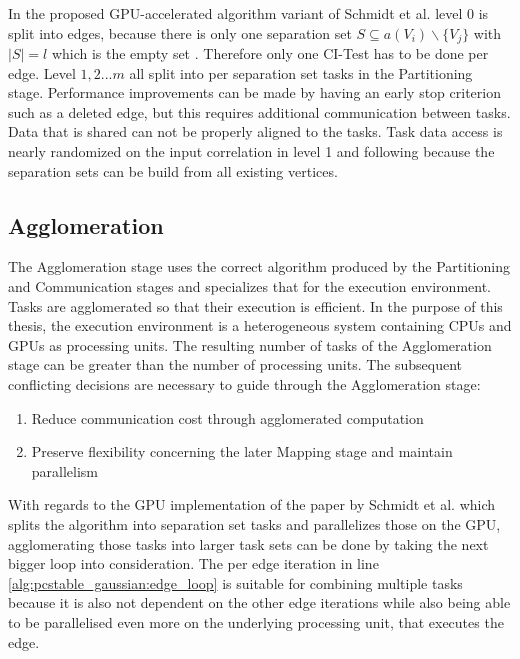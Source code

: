 In the proposed GPU-accelerated algorithm variant of Schmidt et al. \cite{schmidtOrderIndependentConstraintBasedCausal2018} level 0 is split into edges, because there is only one separation set $S \subseteq a(V_i ) \backslash \{V_j\}$ with $| S | = l$ which is the empty set ${}$. Therefore only one CI-Test has to be done per edge.
Level $1,2 ... m$ all split into per separation set tasks in the Partitioning stage. Performance improvements can be made by having an early stop criterion such as a deleted edge, but this requires additional communication between tasks. Data that is shared can not be properly aligned to the tasks. Task data access is nearly randomized on the input correlation in level 1 and following because the separation sets can be build from all existing vertices. 

    
\subsection{Agglomeration}
The Agglomeration stage uses the correct algorithm produced by the Partitioning and Communication stages and specializes that for the execution environment. Tasks are agglomerated so that their execution is efficient. In the purpose of this thesis, the execution environment is a heterogeneous system containing CPUs and GPUs as processing units. The resulting number of tasks of the Agglomeration stage can be greater than the number of processing units. The subsequent conflicting decisions are necessary to guide through the Agglomeration stage:

\begin{enumerate}
    \item Reduce communication cost through agglomerated computation
    \item Preserve flexibility concerning the later Mapping stage and maintain parallelism
\end{enumerate}

With regards to the GPU implementation of the paper by Schmidt et al. \cite{schmidtOrderIndependentConstraintBasedCausal2018} which splits the algorithm into separation set tasks and parallelizes those on the GPU, agglomerating those tasks into larger task sets can be done by 
taking the next bigger loop into consideration. The per edge iteration in line \ref{alg:pcstable_gaussian:edge_loop} is suitable for combining multiple tasks because it is also not dependent on the other edge iterations while also being able to be parallelised even more on the underlying processing unit, that executes the edge.

